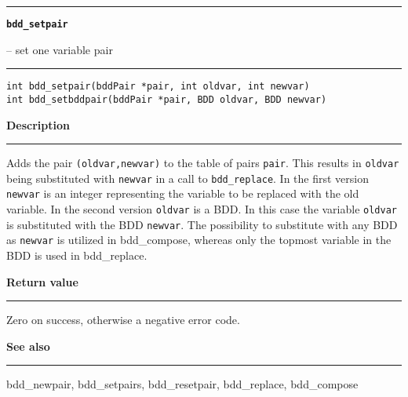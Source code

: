 \begin{minipage}{\textwidth}

\noindent\begin{minipage}{\textwidth}
\rule{\textwidth}{0.5mm}
{\tt\bf bdd\_setpair }
\--- set one variable pair  \hspace{\fill}
\\\rule[1.5ex]{\textwidth}{0.5mm}
\end{minipage}

\noindent\begin{verbatim}
int bdd_setpair(bddPair *pair, int oldvar, int newvar)
int bdd_setbddpair(bddPair *pair, BDD oldvar, BDD newvar) 
\end{verbatim}

\vspace{\parsep}\noindent
{\bf Description}\\\rule[1.5ex]{\textwidth}{0.2mm}\vspace{-1.5ex}\setlength{\parindent}{1em}
Adds the pair {\tt (oldvar,newvar)} to the table of pairs
           {\tt pair}. This results in {\tt oldvar} being substituted
	   with {\tt newvar} in a call to {\tt bdd\_replace}. In the first
	   version {\tt newvar} is an integer representing the variable
	   to be replaced with the old variable.
	   In the second version {\tt oldvar} is a BDD.
	   In this case the variable {\tt oldvar} is substituted with the
	   BDD {\tt newvar}.
	   The possibility to substitute with any BDD as {\tt newvar} is
	   utilized in bdd\_compose, whereas only the topmost variable
	   in the BDD is used in bdd\_replace. 

\setlength{\parindent}{0em}\vspace{\parsep}\vspace{\baselineskip}\noindent
{\bf Return value}\\\rule[1.5ex]{\textwidth}{0.2mm}\vspace{-1.5ex}
Zero on success, otherwise a negative error code. 

\vspace{\parsep}\vspace{\baselineskip}\noindent
{\bf See also}\\\rule[1.5ex]{\textwidth}{0.2mm}\vspace{-1.5ex}
bdd\_newpair, bdd\_setpairs, bdd\_resetpair, bdd\_replace, bdd\_compose 
\end{minipage}
